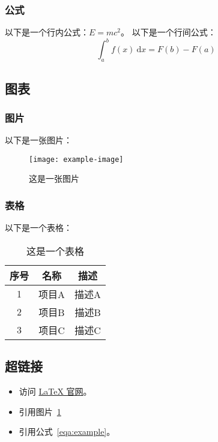 \documentclass[aspectratio=169]{ctexbeamer}
\begin{document}
\subsubsection{公式}
\begin{frame}
以下是一个行内公式：\( E = m c^2 \)\label{eqa:example}。
\pause%
以下是一个行间公式：
\[
\int_{a}^{b} f(x)~\mathrm{d}x = F(b) - F(a)
\]
\end{frame}

\subsection{图表}
\subsubsection{图片}
\begin{frame}
以下是一张图片：
\begin{figure}[htbp]
\centering
\texttt{[image: example-image]} %
\caption{这是一张图片}\label{fig:example}
\end{figure}
\end{frame}

\subsubsection{表格}
\begin{frame}
以下是一个表格：
\begin{table}[htbp]
\centering
\begin{tabular}{ccc}
\toprule
序号 & 名称 & 描述 \\
\midrule
1 & 项目A & 描述A \\
2 & 项目B & 描述B \\
3 & 项目C & 描述C \\
\bottomrule
\end{tabular}
\caption{这是一个表格}\label{tab:example}
\end{table}
\end{frame}

\subsection{超链接}
\begin{frame}
\begin{itemize}
\item<1-> 访问 \href{https://www.latex-project.org/}{LaTeX 官网}。
\item<2-> 引用图片~\ref{fig:example}
\item<3-> 引用公式~\ref{eqa:example}。
\end{itemize}
\end{frame}
\end{document}
